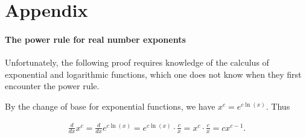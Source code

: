 \part*{Appendix}

\subsection*{The power rule for real number exponents}

Unfortunately, the following proof requires knowledge of the calculus of exponential and logarithmic functions, which one does not know when they first encounter the power rule.

By the change of base for exponential functions, we have $x^c = e^{c\ln(x)}$. Thus

\begin{align*}
    \frac{d}{dx} x^c = \frac{d}{dx} e^{c\ln(x)} = e^{c\ln(x)} \cdot \frac{c}{x} = x^c \cdot \frac{c}{x} = cx^{c - 1}.
\end{align*}

